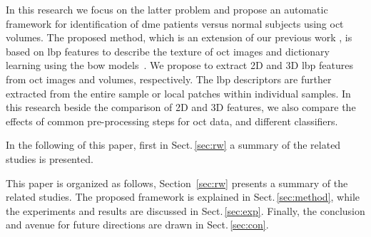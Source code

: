 In this research we focus on the latter problem and propose an automatic framework for identification of \ac{dme} patients versus normal subjects using \ac{oct} volumes.
The proposed method, which is an extension of our previous work \cite{Lemaintre2015miccaiOCT}, is based on \ac{lbp} features to describe the texture of \ac{oct} images and dictionary learning using the \ac{bow} models~\cite{Sivic2003}.
We propose to extract 2D and 3D \ac{lbp} features from \ac{oct} images and volumes, respectively.
The \ac{lbp} descriptors are further extracted from the entire sample or local patches within individual samples.
In this research beside the comparison of 2D and 3D features, we also compare the effects of common pre-processing steps for \ac{oct} data, and different classifiers.

In the following of this paper, first in Sect.\,\ref{sec:rw} a summary of the related studies is presented.

This paper is organized as follows, Section~\ref{sec:rw} presents a summary of the related studies.
The proposed framework is explained in Sect.\,\ref{sec:method}, while the experiments and results are discussed in Sect.\,\ref{sec:exp}.
Finally, the conclusion and avenue for future directions are drawn in Sect.\,\ref{sec:con}.



